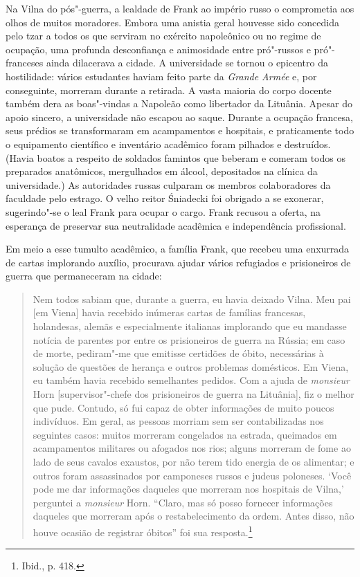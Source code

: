 Na Vilna do pós"-guerra, a lealdade de Frank ao império russo o
comprometia aos olhos de muitos moradores. Embora uma anistia geral
houvesse sido concedida pelo tzar a todos os que serviram no exército
napoleônico ou no regime de ocupação, uma profunda desconfiança e
animosidade entre pró"-russos e pró"-franceses ainda dilacerava a cidade.
A universidade se tornou o epicentro da hostilidade: vários estudantes
haviam feito parte da \textit{Grande Armée} e, por conseguinte, morreram
durante a retirada. A vasta maioria do corpo docente também dera as
boas"-vindas a Napoleão como libertador da Lituânia. Apesar do apoio
sincero, a universidade não escapou ao saque. Durante a ocupação
francesa, seus prédios se transformaram em acampamentos e hospitais, e
praticamente todo o equipamento científico e inventário acadêmico foram
pilhados e destruídos. (Havia boatos a respeito de soldados famintos que
beberam e comeram todos os preparados anatômicos, mergulhados em álcool,
depositados na clínica da universidade.) As autoridades russas culparam
os membros colaboradores da faculdade pelo estrago. O velho reitor
Śniadecki foi obrigado a se exonerar, sugerindo"-se o leal Frank para
ocupar o cargo. Frank recusou a oferta, na esperança de preservar sua
neutralidade acadêmica e independência profissional.

Em meio a esse tumulto acadêmico, a família Frank, que recebeu uma
enxurrada de cartas implorando auxílio, procurava ajudar vários
refugiados e prisioneiros de guerra que permaneceram na cidade:

\begin{quote}
Nem todos sabiam que, durante a guerra, eu havia deixado Vilna. Meu pai
{[}em Viena{]} havia recebido inúmeras cartas de famílias francesas,
holandesas, alemãs e especialmente italianas implorando que eu mandasse
notícia de parentes por entre os prisioneiros de guerra na Rússia; em
caso de morte, pediram"-me que emitisse certidões de óbito, necessárias à
solução de questões de herança e outros problemas domésticos. Em Viena,
eu também havia recebido semelhantes pedidos. Com a ajuda de \textit{monsieur}
Horn {[}supervisor"-chefe dos prisioneiros de guerra na Lituânia{]}, fiz
o melhor que pude. Contudo, só fui capaz de obter informações de muito
poucos indivíduos. Em geral, as pessoas morriam sem ser contabilizadas
nos seguintes casos: muitos morreram congelados na estrada, queimados em
acampamentos militares ou afogados nos rios; alguns morreram de fome ao
lado de seus cavalos exaustos, por não terem tido energia de os
alimentar; e outros foram assassinados por camponeses russos e judeus
poloneses. `Você pode me dar informações daqueles que morreram nos
hospitais de Vilna,' perguntei a \textit{monsieur} Horn. ``Claro, mas só posso
fornecer informações daqueles que morreram após o restabelecimento da
ordem. Antes disso, não houve ocasião de registrar óbitos'' foi sua
resposta.\footnote{Ibid., p. 418.}
\end{quote}

